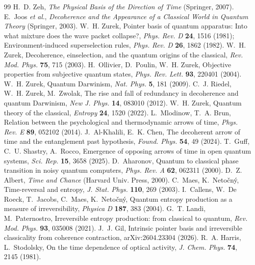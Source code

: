 \documentclass[11pt]{article}
\begin{document}
\begin{thebibliography}{99}\small
{} H.~D. Zeh, \emph{The Physical Basis of the Direction of Time} (Springer, 2007).
 E.~Joos \emph{et al.}, \emph{Decoherence and the Appearance of a Classical World in Quantum Theory} (Springer, 2003).
 W.~H. Zurek, Pointer basis of quantum apparatus: Into what mixture does the wave packet collapse?, \emph{Phys. Rev. D} \textbf{24}, 1516 (1981); Environment-induced superselection rules, \emph{Phys. Rev. D} \textbf{26}, 1862 (1982).
 W.~H. Zurek, Decoherence, einselection, and the quantum origins of the classical, \emph{Rev. Mod. Phys.} \textbf{75}, 715 (2003).
 H.~Ollivier, D.~Poulin, W.~H. Zurek, Objective properties from subjective quantum states, \emph{Phys. Rev. Lett.} \textbf{93}, 220401 (2004).
 W.~H. Zurek, Quantum Darwinism, \emph{Nat. Phys.} \textbf{5}, 181 (2009).
 C.~J. Riedel, W.~H. Zurek, M.~Zwolak, The rise and fall of redundancy in decoherence and quantum Darwinism, \emph{New J. Phys.} \textbf{14}, 083010 (2012).
 W.~H. Zurek, Quantum theory of the classical, \emph{Entropy} \textbf{24}, 1520 (2022).
 L.~Mlodinow, T.~A. Brun, Relation between the psychological and thermodynamic arrows of time, \emph{Phys. Rev. E} \textbf{89}, 052102 (2014).
 J.~Al-Khalili, E.~K. Chen, The decoherent arrow of time and the entanglement past hypothesis, \emph{Found. Phys.} \textbf{54}, 49 (2024).
 T.~Guff, C.~U. Shastry, A.~Rocco, Emergence of opposing arrows of time in open quantum systems, \emph{Sci. Rep.} \textbf{15}, 3658 (2025).
 D.~Aharonov, Quantum to classical phase transition in noisy quantum computers, \emph{Phys. Rev. A} \textbf{62}, 062311 (2000).
 D.~Z. Albert, \emph{Time and Chance} (Harvard Univ. Press, 2000).
 C.~Maes, K.~Neto\v{c}n\'y, Time-reversal and entropy, \emph{J. Stat. Phys.} \textbf{110}, 269 (2003).
 I.~Callens, W.~De Roeck, T.~Jacobs, C.~Maes, K.~Neto\v{c}n\'y, Quantum entropy production as a measure of irreversibility, \emph{Physica D} \textbf{187}, 383 (2004).
 G.~T. Landi, M.~Paternostro, Irreversible entropy production: from classical to quantum, \emph{Rev. Mod. Phys.} \textbf{93}, 035008 (2021).
 J.~J. Gil, Intrinsic pointer basis and irreversible classicality from coherence contraction, arXiv:2604.23304 (2026).
 R.~A. Harris, L.~Stodolsky, On the time dependence of optical activity, \emph{J. Chem. Phys.} \textbf{74}, 2145 (1981).

\end{thebibliography}
\end{document}
